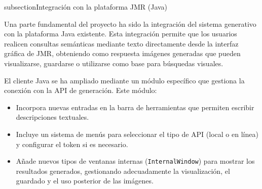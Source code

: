 subsection{Integración con la plataforma JMR (Java)}

Una parte fundamental del proyecto ha sido la integración del sistema generativo con la plataforma Java existente. Esta integración permite que los usuarios realicen consultas semánticas mediante texto directamente desde la interfaz gráfica de JMR, obteniendo como respuesta imágenes generadas que pueden visualizarse, guardarse o utilizarse como base para búsquedas visuales.

El cliente Java se ha ampliado mediante un módulo específico que gestiona la conexión con la API de generación. Este módulo:

\begin{itemize}
    \item Incorpora nuevas entradas en la barra de herramientas que permiten escribir descripciones textuales.
    \item Incluye un sistema de menús para seleccionar el tipo de API (local o en línea) y configurar el token si es necesario.
    \item Añade nuevos tipos de ventanas internas (\texttt{InternalWindow}) para mostrar los resultados generados, gestionando adecuadamente la visualización, el guardado y el uso posterior de las imágenes.
\end{itemize}
